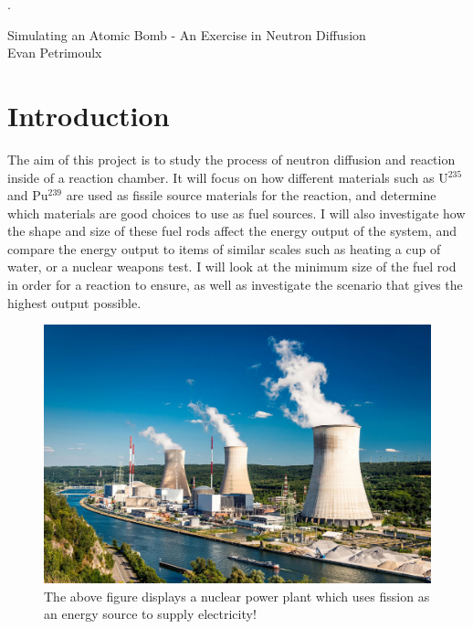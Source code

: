 \documentclass[letterpaper, 12pt]{article}
\begin{document}
   \setcounter{page}{0}.
    \begin{center}
        {\Large Simulating an Atomic Bomb - An Exercise in Neutron Diffusion\\}
        \vspace{0.5em}
        Evan Petrimoulx \\
    \end{center}

    \pagestyle{fancy}
    \fancyhf{}
    \fancyhead[R]{\today}
    \fancyfoot[R]{}
    \setlength{\droptitle}{-6em}

    \vspace{0.25cm}

    \tableofcontents
    \newpage
    \section{ Introduction}
      The aim of this project is to study the process of neutron diffusion and reaction inside of a reaction chamber. It will focus on how different materials such as U$^{235}$ and Pu$^{239}$ are used as fissile source materials for the reaction, and determine which materials are good choices to use as fuel sources. I will also investigate how the shape and size of these fuel rods affect the energy output of the system, and compare the energy output to items of similar scales such as heating a cup of water, or a nuclear weapons test. I will look at the minimum size of the fuel rod in order for a reaction to ensure, as well as investigate the scenario that gives the highest output possible. \\

      \begin{figure}[h!]
         \centering
         \includegraphics[width = 0.7\linewidth]{Images/Nuclear_Power_Plant.jpg}
         \caption{The above figure displays a nuclear power plant which uses fission as an energy source to supply electricity!}
         \label{img:Nuclear_Reactor}
      \end{figure}
\end{document}
